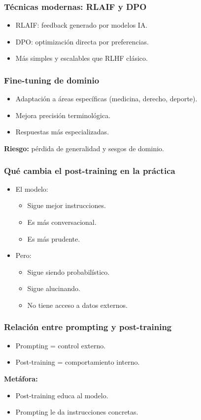 \documentclass[aspectratio=169]{beamer}
\begin{document}
\begin{frame}\frametitle{Técnicas modernas: RLAIF y DPO}
\begin{itemize}
    \item RLAIF: feedback generado por modelos IA.
    \item DPO: optimización directa por preferencias.
    \item Más simples y escalables que RLHF clásico.
\end{itemize}
\end{frame}

\begin{frame}\frametitle{Fine-tuning de dominio}
\begin{itemize}
    \item Adaptación a áreas específicas (medicina, derecho, deporte).
    \item Mejora precisión terminológica.
    \item Respuestas más especializadas.
\end{itemize}

\textbf{Riesgo:} pérdida de generalidad y sesgos de dominio.
\end{frame}

\begin{frame}\frametitle{Qué cambia el post-training en la práctica}
\begin{itemize}
    \item El modelo:
    \begin{itemize}
        \item Sigue mejor instrucciones.
        \item Es más conversacional.
        \item Es más prudente.
    \end{itemize}
    \item Pero:
    \begin{itemize}
        \item Sigue siendo probabilístico.
        \item Sigue alucinando.
        \item No tiene acceso a datos externos.
    \end{itemize}
\end{itemize}
\end{frame}

\begin{frame}\frametitle{Relación entre prompting y post-training}
\begin{itemize}
    \item Prompting = control externo.
    \item Post-training = comportamiento interno.
\end{itemize}

\vspace{0.4em}
\textbf{Metáfora:}
\begin{itemize}
    \item Post-training educa al modelo.
    \item Prompting le da instrucciones concretas.
\end{itemize}
\end{frame}
\end{document}
